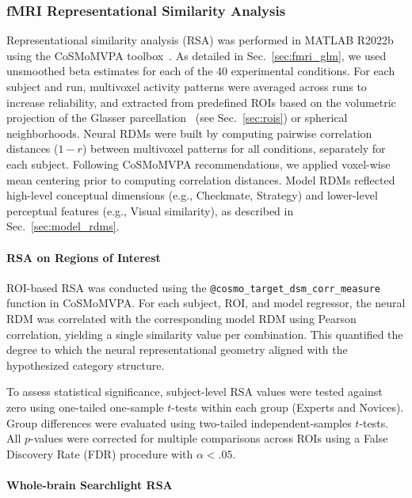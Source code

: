 \documentclass[preprint,12pt]{elsarticle}
\begin{document}
\subsubsection{fMRI Representational Similarity Analysis}\label{sec:fmri_rsa}

Representational similarity analysis (RSA) was performed in MATLAB R2022b using the CoSMoMVPA toolbox~\cite{oosterhof2016cosmomvpa}. As detailed in Sec.~\ref{sec:fmri_glm}, we used unsmoothed beta estimates for each of the 40 experimental conditions. For each subject and run, multivoxel activity patterns were averaged across runs to increase reliability, and extracted from predefined ROIs based on the volumetric projection of the Glasser parcellation~\cite{glasser2016multi} (see Sec.~\ref{sec:rois}) or spherical neighborhoods. Neural RDMs were built by computing pairwise correlation distances ($1 - r$) between multivoxel patterns for all conditions, separately for each subject. Following CoSMoMVPA recommendations, we applied voxel-wise mean centering prior to computing correlation distances. Model RDMs reflected high-level conceptual dimensions (e.g., Checkmate, Strategy) and lower-level perceptual features (e.g., Visual similarity), as described in Sec.~\ref{sec:model_rdms}.

\paragraph{RSA on Regions of Interest}\label{sec:rsa-rois}

ROI-based RSA was conducted using the \texttt{@cosmo\_target\_dsm\_corr\_measure} function in CoSMoMVPA. For each subject, ROI, and model regressor, the neural RDM was correlated with the corresponding model RDM using Pearson correlation, yielding a single similarity value per combination. This quantified the degree to which the neural representational geometry aligned with the hypothesized category structure.

To assess statistical significance, subject-level RSA values were tested against zero using one-tailed one-sample $t$-tests within each group (Experts and Novices). Group differences were evaluated using two-tailed independent-samples $t$-tests. All $p$-values were corrected for multiple comparisons across ROIs using a False Discovery Rate (FDR) procedure with $\alpha < .05$.

\paragraph{Whole-brain Searchlight RSA}\label{sec:searchlight_rsa}
\end{document}
